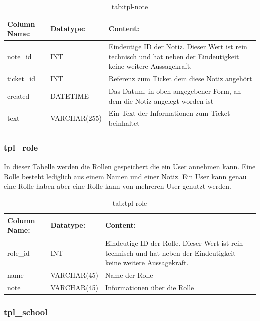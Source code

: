 \begin{table}[h]
	\begin{tabular}{|p{3.5cm}|p{4cm}|p{6.2cm}|}
		\hline
		\textbf{Column Name:} & \textbf{Datatype:} & \textbf{Content:}\\
		\hline
		note\_id & INT & Eindeutige ID der Notiz. Dieser Wert ist rein technisch und hat neben der Eindeutigkeit keine weitere Aussagekraft.\\
		\hline
		ticket\_id & INT & Referenz zum Ticket dem diese Notiz angehört\\
		\hline
		created & DATETIME & Das Datum, in oben angegebener Form, an dem die Notiz angelegt worden ist\\
		\hline
		text & VARCHAR(255) & Ein Text der Informationen zum Ticket beinhaltet\\
		\hline
	\end{tabular}
	\caption{tab:tpl-note}
\end{table}
\label{tab:tpl_note}

\newpage

\subsubsection{tpl\_role}

In dieser Tabelle werden die Rollen gespeichert die ein User annehmen kann. Eine Rolle besteht lediglich aus einem Namen und einer Notiz. Ein User kann genau eine Rolle haben aber eine Rolle kann von mehreren User genutzt werden. 

\begin{table}[h]
	\begin{tabular}{|p{3.5cm}|p{4cm}|p{6.2cm}|}
		\hline
		\textbf{Column Name:} & \textbf{Datatype:} & \textbf{Content:}\\
		\hline
		role\_id & INT & Eindeutige ID der Rolle. Dieser Wert ist rein technisch und hat neben der Eindeutigkeit keine weitere Aussagekraft.\\
		\hline
		name & VARCHAR(45) & Name der Rolle\\
		\hline
		note & VARCHAR(45) & Informationen über die Rolle\\
		\hline
	\end{tabular}
	\caption{tab:tpl-role}
\end{table}
\label{tab:tpl_role}


\subsubsection{tpl\_school}

